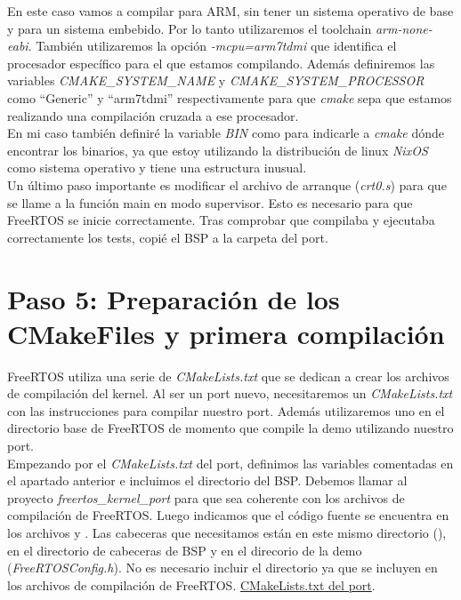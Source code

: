 En este caso vamos a compilar para ARM, sin tener un sistema operativo de base y para un sistema embebido. Por lo tanto utilizaremos el toolchain \emph{arm-none-eabi}. También utilizaremos la opción \emph{-mcpu=arm7tdmi} que identifica el procesador específico para el que estamos compilando. Además definiremos las variables \emph{CMAKE\_SYSTEM\_NAME} y \emph{CMAKE\_SYSTEM\_PROCESSOR} como ``Generic'' y ``arm7tdmi'' respectivamente para que \emph{cmake} sepa que estamos realizando una compilación cruzada a ese procesador.\\


En mi caso también definiré la variable \emph{BIN} como  para indicarle a \emph{cmake} dónde encontrar los binarios, ya que estoy utilizando la distribución de linux \emph{NixOS} como sistema operativo y tiene una estructura inusual.\\

Un último paso importante es modificar el archivo de arranque (\emph{crt0.s}) para que se llame a la función main en modo supervisor. Esto es necesario para que FreeRTOS se inicie correctamente. Tras comprobar que compilaba y ejecutaba correctamente los tests, copié el BSP a la carpeta del port.

\section{Paso 5: Preparación de los CMakeFiles y primera compilación}
FreeRTOS utiliza una serie de \emph{CMakeLists.txt} que se dedican a crear los archivos de compilación del kernel. Al ser un port nuevo, necesitaremos un \emph{CMakeLists.txt} con las instrucciones para compilar nuestro port. Además utilizaremos uno en el directorio base de FreeRTOS de momento que compile la demo utilizando nuestro port.\\

Empezando por el \emph{CMakeLists.txt} del port, definimos las variables comentadas en el apartado anterior e incluimos el directorio del BSP.
Debemos llamar al proyecto \emph{freertos\_kernel\_port} para que sea coherente con los archivos de compilación de FreeRTOS.
Luego indicamos que el código fuente se encuentra en los archivos  y .
Las cabeceras que necesitamos están en este mismo directorio (), en el directorio de cabeceras de BSP y en el direcorio de la demo (\emph{FreeRTOSConfig.h}).
No es necesario incluir el directorio  ya que se incluyen en los archivos de compilación de FreeRTOS.
\href{https://github.com/epaubert/FreeRTOS-Kernel-TFG/blob/4748471870b78355a33cddd2345bfabb41335613/portable/GCC/ARM7_MC13224V/CMakeLists.txt}{CMakeLists.txt del port}.\\

